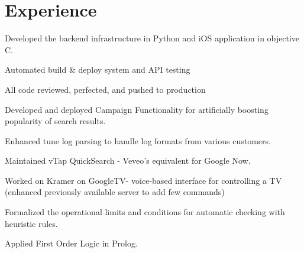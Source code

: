 \documentclass[]{deedy-resume-openfont}
\begin{document}
\hfill
\begin{minipage}[t]{0.66\textwidth} 


\section{Experience}

\vspace{\topsep} %
\begin{tightemize}
\item Developed the backend infrastructure in Python and iOS application in objective C.
\item Automated build \& deploy system and API testing
\item All code reviewed, perfected, and pushed to production
\end{tightemize}
\sectionsep

\begin{tightemize}
\item Developed and deployed Campaign Functionality for artificially boosting popularity of search results.
\item Enhanced tune log parsing to handle log formats from various customers.
\item Maintained vTap QuickSearch - Veveo's equivalent for Google Now.
\item Worked on Kramer on GoogleTV- voice-based interface for controlling a TV (enhanced previously available server to add few commands)
\end{tightemize}
\sectionsep

\begin{tightemize}
\item Formalized the operational limits and conditions for automatic checking with heuristic rules.
\item Applied First Order Logic in Prolog.
\end{tightemize}
\sectionsep


\end{minipage}
\end{document}
